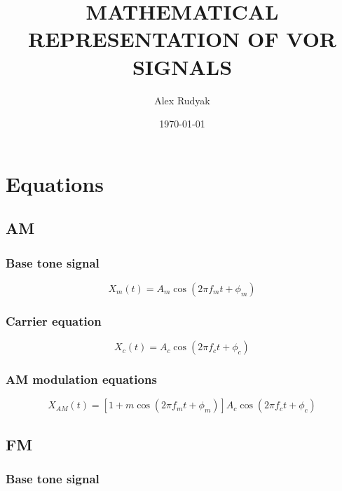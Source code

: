 \documentclass[12pt]{article}
\title{MATHEMATICAL REPRESENTATION OF VOR SIGNALS}
\author{Alex Rudyak}
\date{\today}
\begin{document}
\maketitle
\tableofcontents
\newpage
\section{Equations} %

\subsection{AM}
\subsubsection{Base tone signal}

\begin{equation}
\label{Base tone equation am}
X_{m}(t) = A_m \cos (2\pi f_m t + \phi_m)
\end{equation}

\subsubsection{Carrier equation}

\begin{equation}
\label{Carrier equation am}
X_{c}(t) = A_c \cos (2\pi f_c t + \phi_c)
\end{equation}

\subsubsection{AM modulation equations}

\begin{equation}
\label{AM modulation equation}
X_{AM}(t) = [1 + m\cos(2\pi f_m t + \phi_m)]A_c\cos(2\pi f_c t + \phi_c)
\end{equation}

\subsection{FM}
\subsubsection{Base tone signal}
\end{document}
